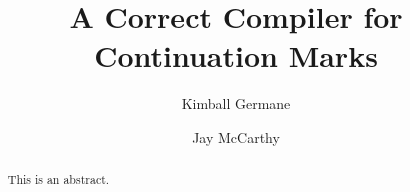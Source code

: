 \documentclass{llncs}
\title{A Correct Compiler for Continuation Marks}
\author{Kimball Germane \and Jay McCarthy}
\institute{Brigham Young University}
\begin{document}
\maketitle

\begin{abstract}
This is an abstract.
\end{abstract}
\end{document}
